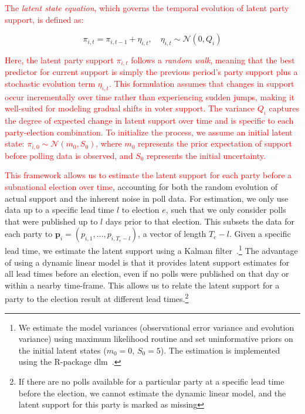 \documentclass[doublespaced,12pt]{article}
\begin{document}
\begin{doublespacing}
\textcolor{red}{The \textit{latent state equation}, which governs the temporal evolution of latent party support, is defined as:}

\begin{equation}
\pi_{i,t} = \pi_{i,t-1} + \eta_{i,t}, \quad \eta_{i,t} \sim \mathcal{N}(0, Q_{i})
\end{equation}

\textcolor{red}{Here, the latent party support \( \pi_{i,t} \) follows a \textit{random walk}, meaning that the best predictor for current support is simply the previous period’s party support plus a stochastic evolution term \( \eta_{i,t} \). This formulation assumes that changes in support occur incrementally over time rather than experiencing sudden jumps, making it well-suited for modeling gradual shifts in voter support. The variance \( Q_i \) captures the degree of expected change in latent support over time and is specific to each party-election combination. To initialize the process, we assume an initial latent state: $\pi_{i,0} \sim \mathcal{N}(m_0, S_0)
$, where \( m_0 \) represents the prior expectation of support before polling data is observed, and \( S_0 \) represents the initial uncertainty.}

\textcolor{red}{This framework allows us to estimate the latent support for each party before a subnational election over time}, accounting for both the random evolution of actual support and the inherent noise in poll data. For estimation, we only use data up to a specific lead time $l$ to  election $e$,  such that we only consider polls that were published up to $l$ days prior to that election. This subsets the data for each party to \( \boldsymbol{p}_{i} = (p_{i,1},  \ldots, p_{i,T_{e}-l})\), a vector of length $T_{e}-l$. Given a specific lead time, we estimate the latent support using a Kalman filter~\citep[][p.103-107]{west1997}.\footnote{We estimate the model variances (observational error variance and evolution variance) using maximum likelihood routine and set uninformative priors on the initial latent states ($m_0 = 0$, $S_0 = 5$). The estimation is implemented using the R-package dlm~\citep{petris2010dlm}.} The advantage of using a dynamic linear model is that it provides latent support estimates for all lead times before an election, even if no polls were published on that day or within a nearby time-frame. This allows us to relate the latent support for a party to the election result at different lead times.\footnote{If there are no polls available for a particular party at a specific lead time before the election, we cannot estimate the dynamic linear model, and the latent support for this party is marked as missing} 


\end{doublespacing}
\end{document}
